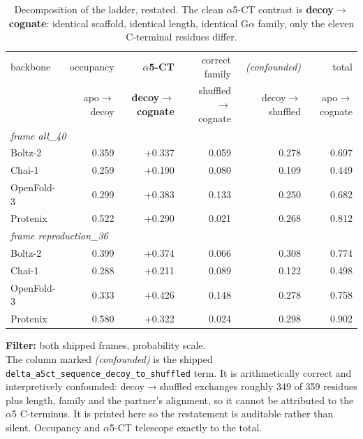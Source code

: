 \begin{table}[htbp]
\centering
\footnotesize
\caption{Decomposition of the ladder, restated. The clean $\alpha$5-CT contrast is \textbf{decoy$\rightarrow$cognate}: identical scaffold, identical length, identical G$\alpha$ family, only the eleven C-terminal residues differ.}
\label{stab:decomposition}
\begin{tabular}{lrrrrr}
\toprule
backbone & occupancy & \textbf{$\alpha$5-CT} & correct family & \textit{(confounded)} & total \\
 & apo$\rightarrow$decoy & \textbf{decoy$\rightarrow$cognate} & shuffled$\rightarrow$cognate & decoy$\rightarrow$shuffled & apo$\rightarrow$cognate \\
\midrule
\multicolumn{6}{l}{\textit{frame all\_40}} \\
\quad Boltz-2 & 0.359 & +0.337 & 0.059 & 0.278 & 0.697 \\
\quad Chai-1 & 0.259 & +0.190 & 0.080 & 0.109 & 0.449 \\
\quad OpenFold-3 & 0.299 & +0.383 & 0.133 & 0.250 & 0.682 \\
\quad Protenix & 0.522 & +0.290 & 0.021 & 0.268 & 0.812 \\
\multicolumn{6}{l}{\textit{frame reproduction\_36}} \\
\quad Boltz-2 & 0.399 & +0.374 & 0.066 & 0.308 & 0.774 \\
\quad Chai-1 & 0.288 & +0.211 & 0.089 & 0.122 & 0.498 \\
\quad OpenFold-3 & 0.333 & +0.426 & 0.148 & 0.278 & 0.758 \\
\quad Protenix & 0.580 & +0.322 & 0.024 & 0.298 & 0.902 \\
\bottomrule
\end{tabular}
\begin{flushleft}\scriptsize
\textbf{Filter:} both shipped frames, probability scale. \\ The column marked \textit{(confounded)} is the shipped \texttt{delta\_a5ct\_sequence\_decoy\_to\_shuffled} term. It is arithmetically correct and interpretively confounded: decoy$\rightarrow$shuffled exchanges roughly 349 of 359 residues plus length, family and the partner's alignment, so it cannot be attributed to the $\alpha$5 C-terminus. It is printed here so the restatement is auditable rather than silent. Occupancy and $\alpha$5-CT telescope exactly to the total.
\end{flushleft}
\end{table}
